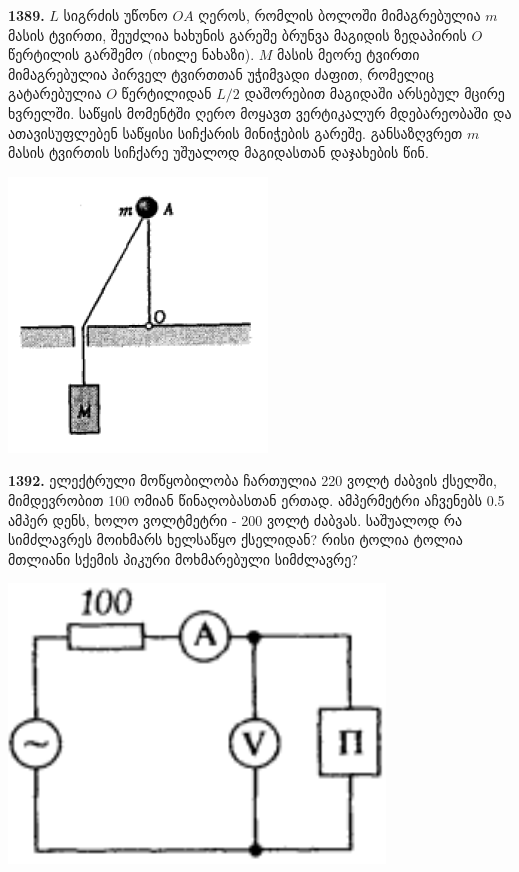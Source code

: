 \documentclass[12pt,a4paper,]{report}
\begin{document}
\textbf{1389.} $L$ სიგრძის უწონო $OA$ ღეროს, რომლის ბოლოში მიმაგრებულია $m$ მასის ტვირთი,  შეუძლია ხახუნის გარეშე ბრუნვა მაგიდის ზედაპირის $O$ წერტილის გარშემო (იხილე ნახაზი). $M$ მასის მეორე ტვირთი მიმაგრებულია პირველ ტვირთთან უჭიმვადი ძაფით, რომელიც გატარებულია $O$ წერტილიდან $L/2$ დაშორებით მაგიდაში არსებულ მცირე ხვრელში. საწყის მომენტში ღერო მოყავთ ვერტიკალურ მდებარეობაში და ათავისუფლებენ საწყისი სიჩქარის მინიჭების გარეშე. განსაზღვრეთ $m$ მასის ტვირთის სიჩქარე უშუალოდ მაგიდასთან დაჯახების წინ.
		\begin{center}
			\includegraphics[scale=0.4]{images/F1389.png}
		\end{center}

\textbf{1392.} ელექტრული მოწყობილობა ჩართულია 220 ვოლტ ძაბვის ქსელში, მიმდევრობით 100 ომიან წინაღობასთან ერთად. ამპერმეტრი აჩვენებს 0.5 ამპერ დენს, ხოლო ვოლტმეტრი - 200 ვოლტ ძაბვას. საშუალოდ რა სიმძლავრეს მოიხმარს ხელსაწყო ქსელიდან? რისი ტოლია ტოლია მთლიანი სქემის პიკური მოხმარებული სიმძლავრე?
		\begin{center}
			\includegraphics[scale=0.4]{images/1392.png}
		\end{center}
\end{document}
